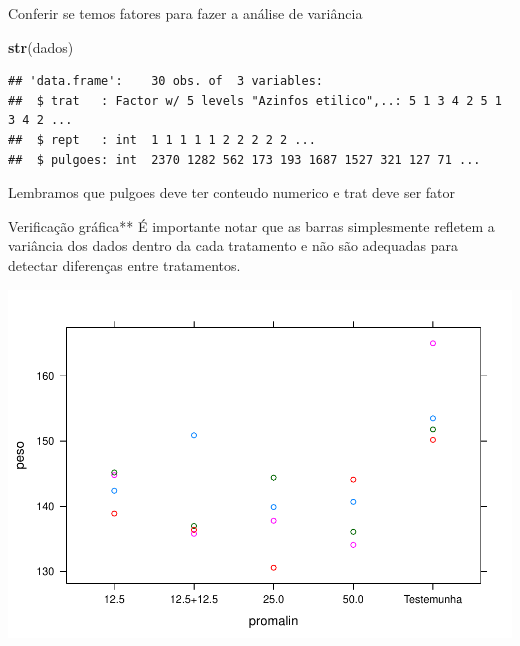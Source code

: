 \documentclass[
]{book}
\newenvironment{Shaded}{\begin{snugshade}}{\end{snugshade}}
\newcommand{\KeywordTok}[1]{\textcolor[rgb]{0.13,0.29,0.53}{\textbf{#1}}}
\newcommand{\NormalTok}[1]{#1}
\newcommand{\OperatorTok}[1]{\textcolor[rgb]{0.81,0.36,0.00}{\textbf{#1}}}
\begin{document}
Conferir se temos fatores para fazer a análise de variância

\begin{Shaded}
\begin{Highlighting}[]
\KeywordTok{str}\NormalTok{(dados)}
\end{Highlighting}
\end{Shaded}

\begin{verbatim}
## 'data.frame':    30 obs. of  3 variables:
##  $ trat   : Factor w/ 5 levels "Azinfos etilico",..: 5 1 3 4 2 5 1 3 4 2 ...
##  $ rept   : int  1 1 1 1 1 2 2 2 2 2 ...
##  $ pulgoes: int  2370 1282 562 173 193 1687 1527 321 127 71 ...
\end{verbatim}

Lembramos que pulgoes deve ter conteudo numerico e trat deve ser fator

\begin{Shaded}
\end{Shaded}

Verificação gráfica**
É importante notar que as barras simplesmente refletem a variância dos dados dentro da cada tratamento e não são adequadas para detectar diferenças entre tratamentos.

\begin{Shaded}
\end{Shaded}

\includegraphics{TudodoR_files/figure-latex/unnamed-chunk-281-1.pdf}
\end{document}
